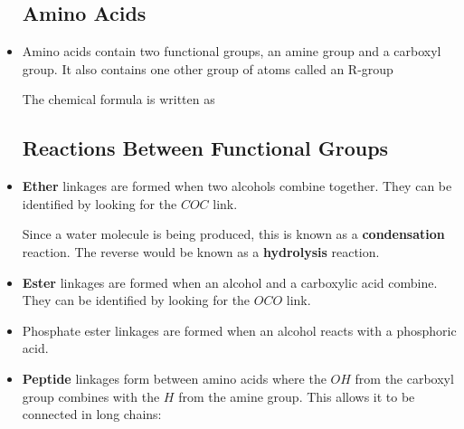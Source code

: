 \documentclass[letterpaper]{article}
\numberwithin{equation}{section}
\theoremstyle{classic}
\begin{document}
\begin{itemize}
    \subsection{Amino Acids}
    \item Amino acids contain two functional groups, an amine group and a carboxyl group. It also contains one other group of atoms called an R-group
    \begin{center}
    \end{center}
    The chemical formula is written as 
    \subsection{Reactions Between Functional Groups}
    \item \textbf{Ether} linkages are formed when two alcohols combine together. They can be identified by looking for the $COC$ link.
    \begin{center}
    \end{center}
    Since a water molecule is being produced, this is known as a \textbf{condensation} reaction. The reverse would be known as a \textbf{hydrolysis} reaction.
    \item \textbf{Ester} linkages are formed when an alcohol and a carboxylic acid combine. They can be identified by looking for the $OCO$ link.
    \begin{center}
    \end{center}
    \item Phosphate ester linkages are formed when an alcohol reacts with a phosphoric acid.
    \begin{center}
    \end{center}
    \item \textbf{Peptide} linkages form between amino acids where the $OH$ from the carboxyl group combines with the $H$ from the amine group. This allows it to be connected in long chains:
    \begin{center}
    \end{center}
    \end{itemize}
\newpage
\end{document}
